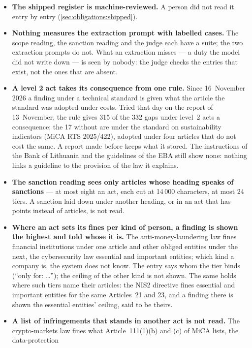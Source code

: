 \begin{itemize}
  \item \textbf{The shipped register is machine-reviewed.} A person did not read it entry by
    entry (\cref{sec:obligations:shipped}).
  \item \textbf{Nothing measures the extraction prompt with labelled cases.} The scope
    reading, the sanction reading and the judge each have a suite; the two extraction
    prompts do not. What an extraction misses --- a duty the model did not write down ---
    is seen by nobody: the judge checks the entries that exist, not the ones that are
    absent.
  \item \textbf{A level 2 act takes its consequence from one rule.} Since 16~November 2026 a
    finding under a technical standard is given what the article the standard was adopted
    under costs. Tried that day on the report of 13~November, the rule gives 315 of the 332
    gaps under level~2 acts a consequence; the 17 without are under the standard on
    sustainability indicators (MiCA RTS 2025/422), adopted under four articles that do not
    cost the same. A report made before keeps what it stored. The instructions of the Bank of
    Lithuania and the guidelines of the EBA still show none: nothing links a guideline to the
    provision of the law it explains.
  \item \textbf{The sanction reading sees only articles whose heading speaks of sanctions}
    --- at most eight an act, each cut at 14\,000 characters, at most 24 tiers. A sanction
    laid down under another heading, or in an act that has points instead of articles, is
    not read.
  \item \textbf{Where an act sets its fines per kind of person, a finding is shown the
    highest and told whose it is.} The anti-money-laundering law fines financial
    institutions under one article and other obliged entities under the next, the
    cybersecurity law essential and important entities; which kind a company is, the system
    does not know. The entry says whom the tier binds (\enquote{only for: …}); the ceiling of
    the other kind is not shown. The same holds where such tiers name their articles: the
    NIS2 directive fines essential and important entities for the same Articles~21 and 23,
    and a finding there is shown the essential entities' ceiling, said to be theirs.
  \item \textbf{A list of infringements that stands in another act is not read.} The
    crypto-markets law fines what Article~111(1)(b) and (c) of MiCA lists, the data-protection

\end{itemize}

